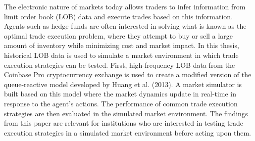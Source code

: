 The electronic nature of markets today allows traders to infer information from limit order book (LOB) data and execute trades based on this information. Agents such as hedge funds are often interested in solving what is known as the optimal trade execution problem, where they attempt to buy or sell a large amount of inventory while minimizing cost and market impact. In this thesis, historical LOB data is used to simulate a market environment in which trade execution strategies can be tested. First, high-frequency LOB data from the Coinbase Pro cryptocurrency exchange is used to create a modified version of the queue-reactive model developed by Huang et al. (2013). A market simulator is built based on this model where the market dynamics update in real-time in response to the agent's actions. The performance of common trade execution strategies are then evaluated in the simulated market environment. The findings from this paper are relevant for institutions who are interested in testing trade execution strategies in a simulated market environment before acting upon them.